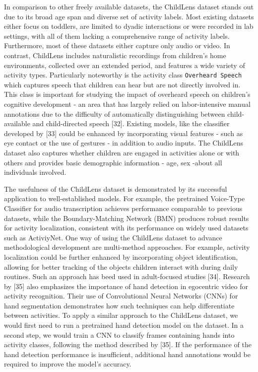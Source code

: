 \documentclass[
  man,floatsintext]{apa6}
\begin{document}
In comparison to other freely available datasets, the ChildLens dataset stands out due to its broad age span and diverse set of activity labels. Most existing datasets either focus on toddlers, are limited to dyadic interactions or were recorded in lab settings, with all of them lacking a comprehensive range of activity labels. Furthermore, most of these datasets either capture only audio or video. In contrast, ChildLens includes naturalistic recordings from children's home environments, collected over an extended period, and features a wide variety of activity types. Particularly noteworthy is the activity class \texttt{Overheard\ Speech} which captures speech that children can hear but are not directly involved in. This class is important for studying the impact of overheard speech on children's cognitive development - an area that has largely relied on labor-intensive manual annotations due to the difficulty of automatically distinguishing between child-available and child-directed speech {[}32{]}. Existing models, like the classifier developed by {[}33{]} could be enhanced by incorporating visual features - such as eye contact or the use of gestures - in addition to audio inputs. The ChildLens dataset also captures whether children are engaged in activities alone or with others and provides basic demographic information - age, sex -about all individuals involved.

The usefulness of the ChildLens dataset is demonstrated by its successful application to well-established models. For example, the pretrained Voice-Type Classifier for audio transcription achieves performance comparable to previous datasets, while the Boundary-Matching Network (BMN) produces robust results for activity localization, consistent with its performance on widely used datasets such as ActiviyNet. One way of using the ChildLens dataset to advance methodological development are multi-method approaches. For example, activity localization could be further enhanced by incorporating object identification, allowing for better tracking of the objects children interact with during daily routines. Such an approach has beed used in adult-focused studies {[}34{]}. Research by {[}35{]} also emphasizes the importance of hand detection in egocentric video for activity recognition. Their use of Convolutional Neural Networks (CNNs) for hand segmentation demonstrates how such techniques can help differentiate between activities. To apply a similar approach to the ChildLens dataset, we would first need to run a pretrained hand detection model on the dataset. In a second step, we would train a CNN to classify frames containing hands into activity classes, following the method described by {[}35{]}. If the performance of the hand detection performance is insufficient, additional hand annotations would be required to improve the model's accuracy.
\end{document}
